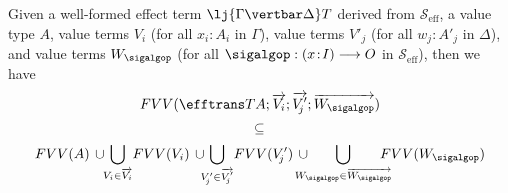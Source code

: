 \begin{proposition}
\label{prop:effecttermtranslationinclusionofvariables}
Given a well-formed effect term $\lj {\Gamma \vertbar \Delta} T$ derived from $\mathcal{S}_{\text{eff}}$, a value type $A$, value terms $V_{i}$ (for all $x_i \!:\! A_i$ in $\Gamma$), value terms $V'_{\!j}$ (for all $w_{\!j} \!:\! A'_{\!j}$ in $\Delta$), and value terms $W_{\sigalgop}$ (for all $\sigalgop : (x \!:\! I) \longrightarrow O$ in $\mathcal{S}_{\text{eff}}$), then we have
\[
FVV(\efftrans T {A; \overrightarrow{V_i}; \overrightarrow{V'_{\!j}}; \overrightarrow{W_{\sigalgop}}}) 
\vspace{-0.15cm}
\]
\[
\subseteq
\vspace{-0.1cm}
\]
\[
FVV(A) \,\cup\!\! \bigcup_{V_i \in \overrightarrow{V_i}} \! FVV(V_i) \,\cup\!\!\! \bigcup_{V'_{\!j} \in \overrightarrow{V'_{\!j}}} \! FVV(V'_{\!j}) \,\cup\!\!\!\!\!\!\! \bigcup_{W_{\sigalgop} \in \overrightarrow{W_{\sigalgop}}} \!\!\!\!\!\! FVV(W_{\sigalgop}) 
\]
\end{proposition}

